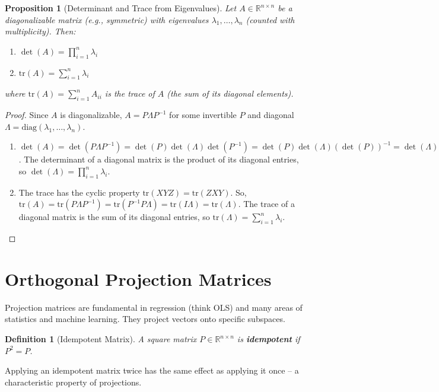 \documentclass[11pt, a4paper]{article}
\theoremstyle{mydefinitionstyle}
\newtheorem{definition}{Definition}[section]
\theoremstyle{mytheoremstyle}
\newtheorem{proposition}{Proposition}[section]
\newcommand{\R}{\mathbb{R}}
\newcommand{\tr}{\text{tr}} %
\begin{document}
\begin{proposition}[Determinant and Trace from Eigenvalues] \label{prop:det_trace_eigen}
    Let $A \in \R^{n \times n}$ be a diagonalizable matrix (e.g., symmetric) with eigenvalues $\lambda_1, \dots, \lambda_n$ (counted with multiplicity). Then:
    \begin{enumerate}
        \item $\det(A) = \prod_{i=1}^{n} \lambda_i$
        \item $\tr(A) = \sum_{i=1}^{n} \lambda_i$
    \end{enumerate}
    where $\tr(A) = \sum_{i=1}^n A_{ii}$ is the trace of $A$ (the sum of its diagonal elements).
\end{proposition}
\begin{proof}
    Since $A$ is diagonalizable, $A = P \Lambda P^{-1}$ for some invertible $P$ and diagonal $\Lambda = \text{diag}(\lambda_1, \dots, \lambda_n)$.
    \begin{enumerate}
        \item $\det(A) = \det(P \Lambda P^{-1}) = \det(P) \det(\Lambda) \det(P^{-1}) = \det(P) \det(\Lambda) (\det(P))^{-1} = \det(\Lambda)$. The determinant of a diagonal matrix is the product of its diagonal entries, so $\det(\Lambda) = \prod_{i=1}^n \lambda_i$.
        \item The trace has the cyclic property $\tr(XYZ) = \tr(ZXY)$. So, $\tr(A) = \tr(P \Lambda P^{-1}) = \tr(P^{-1} P \Lambda) = \tr(I \Lambda) = \tr(\Lambda)$. The trace of a diagonal matrix is the sum of its diagonal entries, so $\tr(\Lambda) = \sum_{i=1}^n \lambda_i$.
    \end{enumerate}
\end{proof}

\section{Orthogonal Projection Matrices}

Projection matrices are fundamental in regression (think OLS) and many areas of statistics and machine learning. They project vectors onto specific subspaces.

\begin{definition}[Idempotent Matrix] \label{def:idempotent}
    A square matrix $P \in \R^{n \times n}$ is \textbf{idempotent} if $P^2 = P$.
\end{definition}
Applying an idempotent matrix twice has the same effect as applying it once – a characteristic property of projections.
\end{document}
